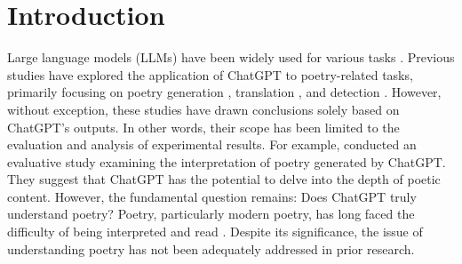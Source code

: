 \documentclass[11pt]{article}
\begin{document}


\section{Introduction}




Large language models (LLMs) have been widely used for various tasks \cite{zhang2024electionsim,shen2025measuring,chatterjee2025assessing,lan-etal-2025-f2bench,ye2025unveiling,lin-etal-2025-large}. Previous studies have explored the application of ChatGPT to poetry-related tasks, primarily focusing on poetry generation \cite{antar2023effectiveness,deng2024can,hutson2023poetry}, translation \cite{virvou2023chatgpt, wang-etal-2024-best}, and detection \cite{wang-etal-2025-benchmarking}. However, without exception, these studies have drawn conclusions solely based on ChatGPT's outputs. In other words, their scope has been limited to the evaluation and analysis of experimental results. For example, \citet{virvou2023chatgpt} conducted an evaluative study examining the interpretation of poetry generated by ChatGPT. They suggest that ChatGPT has the potential to delve into the depth of poetic content. However, the fundamental question remains: Does ChatGPT truly understand poetry? Poetry, particularly modern poetry, has long faced the difficulty of being interpreted and read \cite{ZhangTaozhou2022Problems}. Despite its significance, the issue of understanding poetry has not been adequately addressed in prior research.


\end{document}
